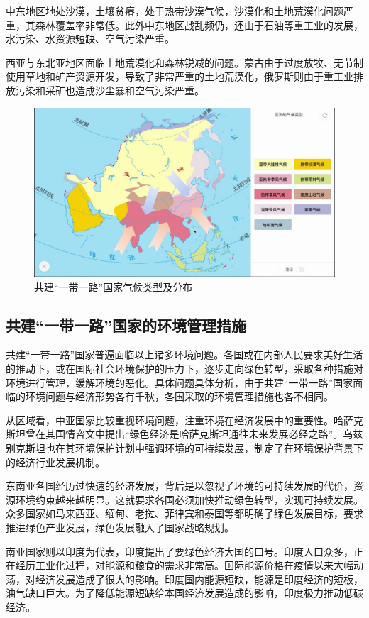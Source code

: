 \documentclass[a4paper,12pt]{ctexart}
\begin{document}
中东地区地处沙漠，土壤贫瘠，处于热带沙漠气候，沙漠化和土地荒漠化问题严重，其森林覆盖率非常低。此外中东地区战乱频仍，还由于石油等重工业的发展，水污染、水资源短缺、空气污染严重。

西亚与东北亚地区面临土地荒漠化和森林锐减的问题。蒙古由于过度放牧、无节制使用草地和矿产资源开发，导致了非常严重的土地荒漠化，俄罗斯则由于重工业排放污染和采矿也造成沙尘暴和空气污染严重。

\begin{figure}[H]
    \centering
    \includegraphics[width=0.8\linewidth]{img/气候.jpeg}
    \caption{共建“一带一路”国家气候类型及分布}
\end{figure}

\subsection*{共建“一带一路”国家的环境管理措施}

共建“一带一路”国家普遍面临以上诸多环境问题。各国或在内部人民要求美好生活的推动下，或在国际社会环境保护的压力下，逐步走向绿色转型，采取各种措施对环境进行管理，缓解环境的恶化。具体问题具体分析，由于共建“一带一路”国家面临的环境问题与经济形势各有千秋，各国采取的环境管理措施也各不相同。

从区域看，中亚国家比较重视环境问题，注重环境在经济发展中的重要性。哈萨克斯坦曾在其国情咨文中提出“绿色经济是哈萨克斯坦通往未来发展必经之路”。乌兹别克斯坦也在其环境保护计划中强调环境的可持续发展，制定了在环境保护背景下的经济行业发展机制。

东南亚各国经历过快速的经济发展，背后是以忽视了环境的可持续发展的代价，资源环境约束越来越明显。这就要求各国必须加快推动绿色转型，实现可持续发展。众多国家如马来西亚、缅甸、老挝、菲律宾和泰国等都明确了绿色发展目标，要求推进绿色产业发展，绿色发展融入了国家战略规划。

南亚国家则以印度为代表，印度提出了要绿色经济大国的口号。印度人口众多，正在经历工业化过程，对能源和粮食的需求非常高。国际能源价格在疫情以来大幅动荡，对经济发展造成了很大的影响。印度国内能源短缺，能源是印度经济的短板，油气缺口巨大。为了降低能源短缺给本国经济发展造成的影响，印度极力推动低碳经济。
\end{document}
